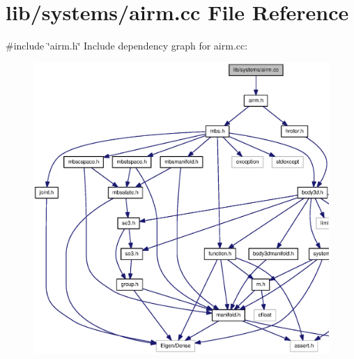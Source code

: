 \section{lib/systems/airm.cc \-File \-Reference}
\label{airm_8cc}
{\ttfamily \#include \char`\"{}airm.\-h\char`\"{}}\*
\-Include dependency graph for airm.\-cc\-:
\nopagebreak
\begin{figure}[H]
\begin{center}
\leavevmode
\includegraphics[width=350pt]{airm_8cc__incl}
\end{center}
\end{figure}
